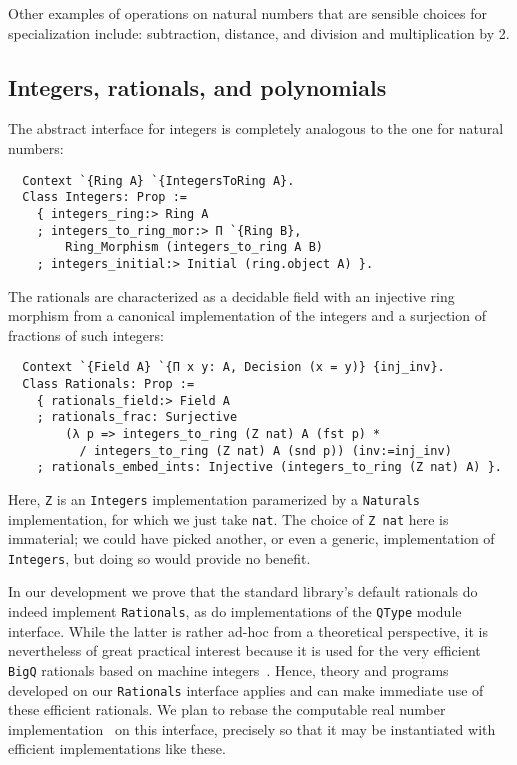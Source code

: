 \documentclass[a4paper,10pt,runningheads]{llncs}
\begin{document}
Other examples of operations on natural numbers that are sensible choices for specialization include: subtraction, distance, and division and multiplication by 2.

\subsection{Integers, rationals, and polynomials}

The abstract interface for integers is completely analogous to the one for natural numbers:
\begin{lstlisting}
  Context `{Ring A} `{IntegersToRing A}.
  Class Integers: Prop :=
    { integers_ring:> Ring A
    ; integers_to_ring_mor:> Π `{Ring B},
        Ring_Morphism (integers_to_ring A B)
    ; integers_initial:> Initial (ring.object A) }.
\end{lstlisting}

The rationals are characterized as a decidable field with an injective ring morphism from a canonical implementation of the integers and a surjection of fractions of such integers:
\begin{lstlisting}
  Context `{Field A} `{Π x y: A, Decision (x = y)} {inj_inv}.
  Class Rationals: Prop :=
    { rationals_field:> Field A
    ; rationals_frac: Surjective
        (λ p => integers_to_ring (Z nat) A (fst p) *
          / integers_to_ring (Z nat) A (snd p)) (inv:=inj_inv)
    ; rationals_embed_ints: Injective (integers_to_ring (Z nat) A) }.
\end{lstlisting}
Here, \lstinline|Z| is an \lstinline|Integers| implementation paramerized by a \lstinline|Naturals| implementation, for which we just take \lstinline|nat|. The choice of \lstinline|Z nat| here is immaterial; we could have picked another, or even a generic, implementation of \lstinline|Integers|, but doing so would provide no benefit.


In our development we prove that the standard library's default rationals do indeed implement \lstinline|Rationals|, as do implementations of the \lstinline|QType| module interface. While the latter is rather ad-hoc from a theoretical perspective, it is nevertheless of great practical interest because it is used for the very efficient \lstinline|BigQ| rationals based on machine integers~\cite{machineintegers}. Hence, theory and programs developed on our \lstinline|Rationals| interface applies and can make immediate use of these efficient rationals. We plan to rebase the computable real number implementation~\cite{Oconnor:real} on this interface, precisely so that it may be instantiated with efficient implementations like these.
\end{document}
